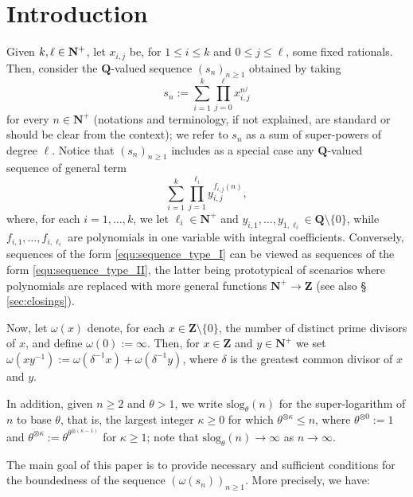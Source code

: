 \documentclass[reqno]{amsart}
\theoremstyle{remark}
\providecommand{\NNb}{\mathbf{N}}
\providecommand{\QQb}{\mathbf{Q}}
\providecommand{\ZZb}{\mathbf{Z}}
\newcommand{\slog}{\mathrm{slog}}
\begin{document}
\section{Introduction}\label{sec:introduction}
%
Given $k, \ell \in {\bf N}^+$, let $x_{i,j}$ be, for $1 \le i \le k$ and $0 \le j \le \ell$, some fixed rationals.
Then, consider the $\QQb$-valued sequence $(s_n)_{n\ge 1}$ obtained by taking
%
\begin{equation}\label{equ:sequence_type_I}
s_n := \sum_{i=1}^k \prod_{j=0}^\ell x_{i,j}^{n^j}
\end{equation}
%
for every $n \in \NNb^+$ (notations and terminology, if not explained, are standard or should
be clear from the context); we refer to $s_n$ as a sum of super-powers of degree $\ell$.
Notice that $(s_n)_{n \ge 1}$ includes as a special case any $\QQb$-valued sequence of general term
%
\begin{equation}
\label{equ:sequence_type_II}
\sum_{i = 1}^k \prod_{j = 1}^{\ell_i} y_{i,j}^{f_{i,j}(n)},
\end{equation}
%
where, for each $i = 1, \ldots, k$, we let $\ell_i \in \NNb^+$ and $y_{i,1}, \ldots, y_{1,\ell_i} \in \QQb \setminus \{0\}$, while $f_{i,1}, \ldots, f_{i,\ell_i}$ are polynomials in one variable with integral coefficients. Conversely,  sequences of the form \eqref{equ:sequence_type_I} can be viewed as sequences of the form \eqref{equ:sequence_type_II}, the latter being prototypical of scenarios where polynomials are replaced with more general functions $\NNb^+ \to \ZZb$ (see also \S{ }\ref{sec:closings}).

Now, let $\omega(x)$ denote, for each $x \in \ZZb \setminus \{0\}$, the number of distinct prime divisors of $x$, and define $\omega(0):=\infty$. Then, for $x \in \ZZb$ and $y \in \NNb^+$ we set $\omega(xy^{-1}) := \omega(\delta^{-1} x) + \omega(\delta^{-1} y)$, where $\delta$ is the greatest common divisor of $x$ and $y$.

In addition, given $n \ge 2$ and $\theta > 1$, we write $\slog_\theta(n)$ for the super-logarithm of $n$ to base $\theta$, that is, the largest integer $\kappa \ge 0$ for which $\theta^{\otimes \kappa} \le n$, where $\theta^{\otimes 0} := 1$ and $\theta^{\otimes \kappa} := \theta^{\theta^{\otimes (\kappa-1)}}$ for $\kappa \ge 1$;
note that $\slog_\theta(n) \to \infty$ as $n \to \infty$.

The main goal of this paper is to provide necessary and sufficient conditions for the boundedness of the sequence $(\omega(s_n))_{n \ge 1}$. More precisely, we have:
\end{document}

